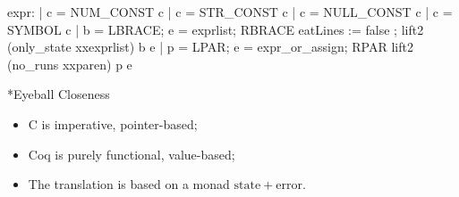 \documentclass{beamer}
\begin{document}
\frame{\questiontoc}

\begin{frame}[fragile]
    \label{frame:parser}


\begin{camlcode}
expr:
  | c = NUM_CONST                       { c }
  | c = STR_CONST                       { c }
  | c = NULL_CONST                      { c }
  | c = SYMBOL                          { c }
  | b = LBRACE; e = exprlist; RBRACE
    { eatLines := false ; lift2 (only_state xxexprlist) b e }
  | p = LPAR; e = expr_or_assign; RPAR
    { lift2 (no_runs xxparen) p e }
\end{camlcode}

\end{frame}

\frame{\questiontoc}

\sectionframe**{Eyeball Closeness}{
    \label{frame:eyeball}
    \begin{itemize}
        \item C is imperative, pointer-based;
        \item Coq is purely functional, value-based;
        \item The translation is based on a monad \(\mathrm{state}+\mathrm{error}\).
    \end{itemize}
}
\end{document}
